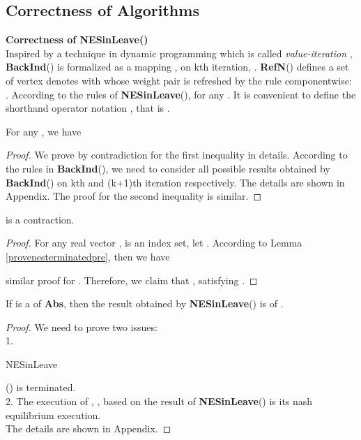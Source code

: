 \documentclass{acm_proc_article-sp}
\begin{document}
\subsection{Correctness of Algorithms}

\textbf{Correctness of \textbf{NESinLeave}()}\\
Inspired by a technique in dynamic programming which is called \textit{value-iteration} \cite{vander, ls}, \textbf{BackInd}() is formalized as a mapping , on kth iteration, . \textbf{RefN}() defines a set of vertex  denotes  with  whose weight pair is refreshed by the rule componentwise: . According to the rules of \textbf{NESinLeave}(),   for any . It is convenient to define the shorthand operator notation , that is .

\begin{Lemma}
\label{provenesterminatedpre}
For any , we have


\end{Lemma}

\begin{proof}
We prove by contradiction for the first inequality in details. According to the rules in \textbf{BackInd}(), we need to consider all possible results obtained by \textbf{BackInd}() on kth and (k+1)th iteration respectively. The details are shown in Appendix. The proof for the second inequality is similar.
\end{proof}

\begin{Lemma}
\label{provenesterminated}
 is a contraction.
\end{Lemma}
\begin{proof}
For any real vector ,  is an index set, let . According to Lemma \ref{provenesterminatedpre}, then we have

similar proof for . Therefore, we claim that , satisfying .
\end{proof}

\begin{Theorem}
\label{provenesinleave}
If  is a  of \textbf{Abs}, then the result obtained by \textbf{NESinLeave}() is  of .
\end{Theorem}
\begin{proof}
We need to prove two issues: \\
1. \begin{bf}NESinLeave\end{bf}() is terminated.\\
2. The execution of , , based on the result of \textbf{NESinLeave}() is its nash equilibrium execution.\\
The details are shown in Appendix.
\end{proof}
\end{document}
